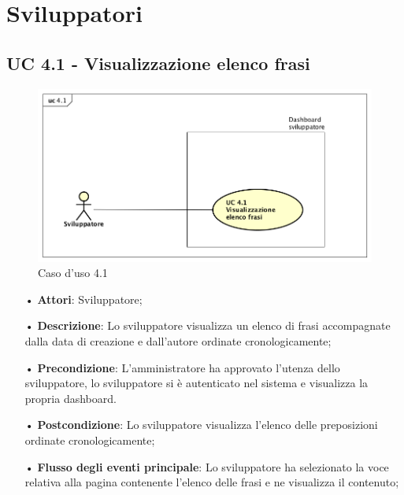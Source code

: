 \section{Sviluppatori}
\subsection{UC 4.1 - Visualizzazione elenco frasi}
\begin{figure}[H]
\centering
\includegraphics[width=17cm]{img/UC410.png} 
\caption{Caso d'uso 4.1}\label{fig:410}
\end{figure}
\begin{itemize}
\item[•]\textbf{Attori}: Sviluppatore;
\item[•]\textbf{Descrizione}: Lo sviluppatore visualizza un elenco di frasi accompagnate dalla data di creazione e dall’autore ordinate cronologicamente;
\item[•]\textbf{Precondizione}:  L'amministratore ha approvato l'utenza dello sviluppatore, lo sviluppatore si è autenticato nel sistema e visualizza la propria dashboard.
\item[•]\textbf{Postcondizione}: Lo sviluppatore visualizza l'elenco delle preposizioni ordinate cronologicamente;
\item[•]\textbf{Flusso degli eventi principale}: Lo sviluppatore ha selezionato la voce relativa alla pagina contenente l’elenco delle frasi e ne visualizza il contenuto; 
\end{itemize}
